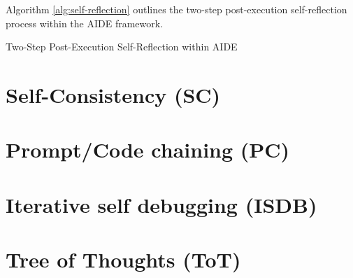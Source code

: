 Algorithm \ref{alg:self-reflection} outlines the two-step post-execution self-reflection process within the AIDE framework.

\begin{algorithm}
\caption{Two-Step Post-Execution Self-Reflection within AIDE}
\label{alg:self-reflection}
\end{algorithm}

\section{Self-Consistency (SC)}

\section{Prompt/Code chaining (PC)}

\section{Iterative self debugging (ISDB)}

\section{Tree of Thoughts (ToT)}
